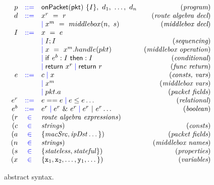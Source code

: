\begin{figure}[ht]
{%
\scriptsize
\[%
\begin{array}{rclr}
p &\bnfdef & \ONPKT\ \{I\},\ d_1,\ \ldots,\ d_n &(\textit{program})\\
d &\bnfdef & x^r\ =\ r\  & (\textit{route algebra decl})\\
 & & \bnfalt x^m\ =\ middlebox(n,\ s) & (\textit{middlebox decl})\\
I &\bnfdef & x\ =\ e & \\
 & & \bnfalt I;I &  (\textit{sequencing})\\
 & & \bnfalt x\ =\ x^m.handle(pkt) &  (\textit{middlebox operation})\\
 & & \bnfalt \ifelse{e^b}{I}{I} &  (\textit{conditional})\\ %
 & & \bnfalt \return{x^r} \bnfalt \return{r} &  (\textit{func return})\\ 
e &\bnfdef & c \bnfalt x &  (\textit{consts, vars})\\
& & \bnfalt x^m & (\textit{middlebox vars}) \\
& & \bnfalt pkt.a & (\textit{packet fields}) \\
e^r & \bnfdef & e == e \bnfalt e \leq e \dots & (\textit{relational})\\
e^b & \bnfdef & e^r \bnfalt e^r\ \&\ e^r \bnfalt e^r\ |\ e^r \dots & (\textit{boolean})\\
(r &{\color{blue}{\in}}&\mathit{route\ algebra\ expressions}) & \\
(c &{\color{blue}{\in}}& \mathit{strings}) & (\mathit{consts})\\
(a &{\color{blue}{\in}}& \{ \mathit{macSrc}, \mathit{ipDst} \dots \}) & (\textit{packet fields})\\
(n &{\color{blue}{\in}}& \mathit{strings})  &  (\textit{middlebox names})\\
(s &{\color{blue}{\in}}& \{ \mathit{stateless},\mathit{stateful} \})  &  (\textit{properties})\\
(x &{\color{blue}{\in}} & \{\tx_1,\tx_2,\dots,\ty_1,\dots\}) &  (\textit{variables})\\
\end{array}\]}%
\caption{\concept{} abstract syntax.}
\label{fig:grammar1}
\end{figure}



